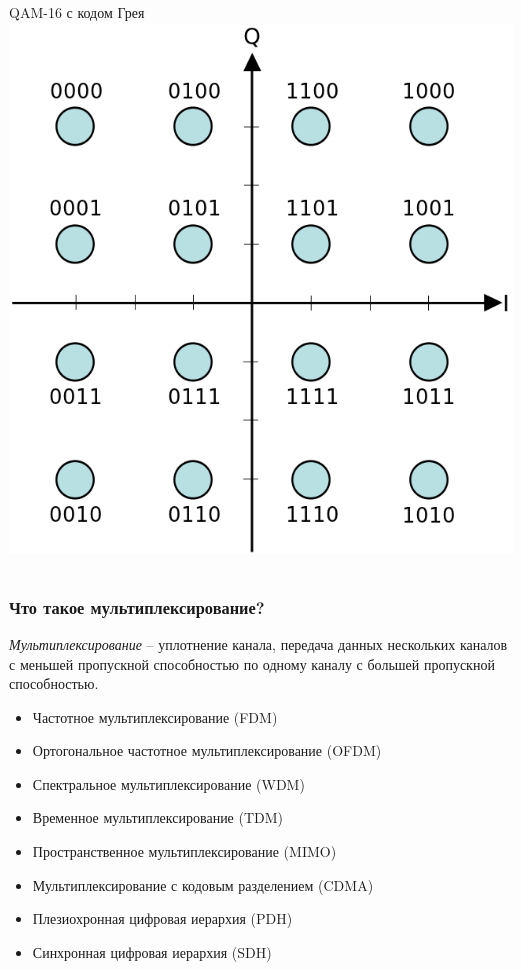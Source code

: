 \documentclass[utf8]{beamer}
\begin{document}
\begin{frame}
\begin{columns}
\begin{block}{QAM-16 с кодом Грея}
\includegraphics[width=\textwidth]{pic/16QAM_Gray_Coded.png}
\end{block}
\end{columns}
\end{frame}
\begin{frame}
\frametitle{Что такое мультиплексирование?}
\emph{Мультиплексирование} – уплотнение канала, передача данных нескольких каналов с меньшей пропускной способностью по одному каналу с большей пропускной способностью.
\begin{itemize}
	\item Частотное мультиплексирование (FDM)
	\item Ортогональное частотное мультиплексирование (OFDM)
	\item Спектральное мультиплексирование (WDM)
	\item Временное мультиплексирование (TDM)
	\item Пространственное мультиплексирование (MIMO)
	\item Мультиплексирование с кодовым разделением (CDMA)
	\item Плезиохронная цифровая иерархия (PDH)
	\item Синхронная цифровая иерархия (SDH)
\end{itemize}
\end{frame}
\end{document}
